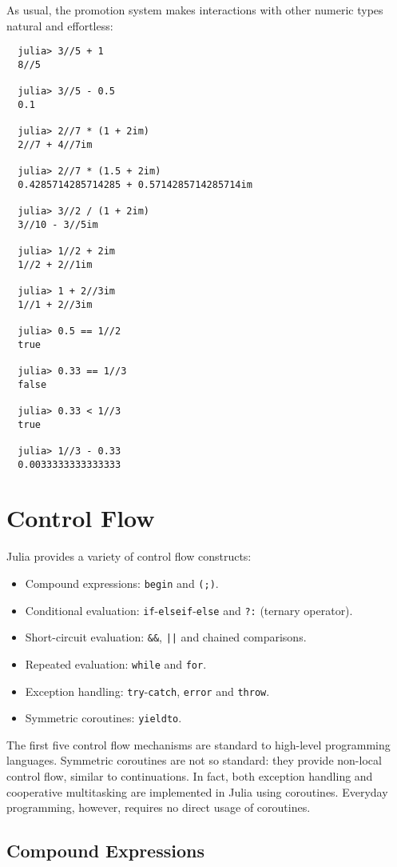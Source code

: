 \documentclass{article}
\renewcommand{\sec}[1]{\label{sec:#1}}
\begin{document}
As usual, the promotion system makes interactions with other numeric types natural and effortless:
\begin{verbatim}
  julia> 3//5 + 1
  8//5

  julia> 3//5 - 0.5
  0.1

  julia> 2//7 * (1 + 2im)
  2//7 + 4//7im

  julia> 2//7 * (1.5 + 2im)
  0.4285714285714285 + 0.5714285714285714im

  julia> 3//2 / (1 + 2im)
  3//10 - 3//5im

  julia> 1//2 + 2im
  1//2 + 2//1im

  julia> 1 + 2//3im
  1//1 + 2//3im

  julia> 0.5 == 1//2
  true

  julia> 0.33 == 1//3
  false

  julia> 0.33 < 1//3
  true

  julia> 1//3 - 0.33
  0.0033333333333333
\end{verbatim}

\section{Control Flow}\sec{control-flow}

Julia provides a variety of control flow constructs:
\begin{itemize}
\item Compound expressions: \verb|begin| and \verb|(;)|.
\item Conditional evaluation: \verb|if|-\verb|elseif|-\verb|else| and \verb|?:| (ternary operator).
\item Short-circuit evaluation: \verb|&&|, \texttt{||} and chained comparisons.
\item Repeated evaluation: \verb|while| and \verb|for|.
\item Exception handling: \verb|try|-\verb|catch|, \verb|error| and \verb|throw|.
\item Symmetric coroutines: \verb|yieldto|.
\end{itemize}
The first five control flow mechanisms are standard to high-level programming languages.
Symmetric coroutines are not so standard:
they provide non-local control flow, similar to continuations.
In fact, both exception handling and cooperative multitasking are implemented in Julia using coroutines.
Everyday programming, however, requires no direct usage of coroutines.

\subsection{Compound Expressions}\sec{compound-expressions}
\end{document}
